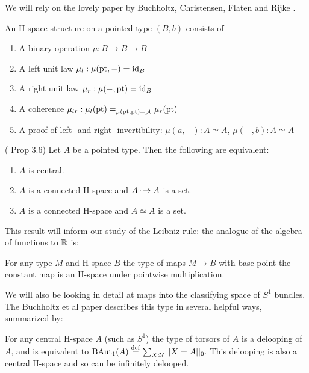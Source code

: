 \documentclass[12pt]{article}
\begin{document}
We will rely on the lovely paper by Buchholtz, Christensen, Flaten and Rijke \cite{buchholtz2023central}. 

\begin{mydef}
An H-space structure on a pointed type \( (B,b) \) consists of
\begin{enumerate}
\item A binary operation \( \mu:B\to B\to B \)
\item A left unit law \( \mu_l:\mu(\mathrm{pt},-)=\text{id}_B \)
\item A right unit law \( \mu_r:\mu(-,\mathrm{pt})=\text{id}_B \)
\item A coherence \( \mu_{lr}:\mu_l(\mathrm{pt})=_{\mu(\mathrm{pt},\mathrm{pt})=\mathrm{pt}}\mu_r(\mathrm{pt}) \)
\item A proof of left- and right- invertibility: \( \mu(a,-):A\simeq A \), \( \mu(-, b):A\simeq A \)
\end{enumerate}
\end{mydef}

\begin{myprop}
(\cite{buchholtz2023central} Prop 3.6) Let \( A \) be a pointed type. Then the following are equivalent:
\begin{enumerate}
\item \( A \) is central.
\item \( A \) is a connected H-space and \( A\,\cdot\!\to A \) is a set.
\item \( A \) is a connected H-space and \( A\simeq A \) is a set.
\end{enumerate}
\end{myprop}

This result will inform our study of the Leibniz rule: the analogue of the algebra of functions to \( \mathbb{R} \) is:
\begin{myprop}
For any type \( M \) and H-space \( B \) the type of maps \( M\to B \) with base point the constant map is an H-space under pointwise multiplication.
\end{myprop}

We will also be looking in detail at maps into the classifying space of \( S^1 \) bundles. The Buchholtz et al paper\cite{buchholtz2023central} describes this type in several helpful ways, summarized by:

\begin{mythm}
For any central H-space \( A \) (such as \( S^1 \)) the type of torsors of \( A \) is a delooping of \( A \), and is equivalent to \( \mathrm{BAut}_1(A)\stackrel{\mathrm{def}}{=} \sum_{X:\mathcal{U}}||X=A||_0. \) This delooping is also a central H-space and so can be infinitely delooped.
\end{mythm}
\end{document}
